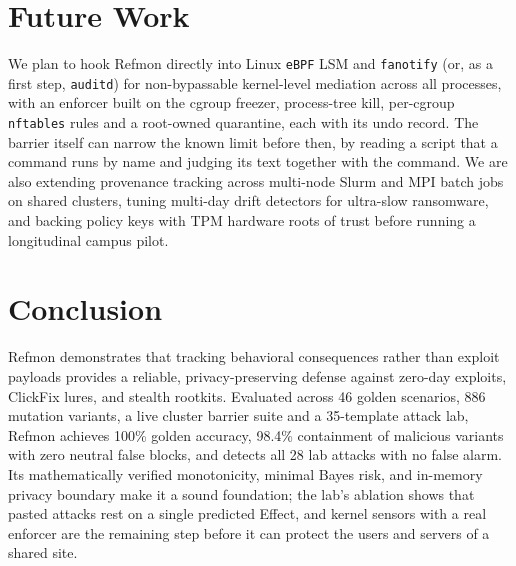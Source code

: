 \documentclass[10pt,twocolumn,letterpaper]{article}
\makeatletter
\theoremstyle{plain}
\theoremstyle{definition}
\theoremstyle{remark}
\DeclareRobustCommand{\_}{\ifmmode\nfss@text{\textunderscore}\else\textunderscore\penalty\@highpenalty\hskip\z@skip\fi}
\makeatother
\begin{document}
\section{Future Work}
\label{sec:future}
We plan to hook Refmon directly into Linux \texttt{eBPF} LSM and \texttt{fanotify} (or, as a first step, \texttt{auditd}) for non-bypassable kernel-level mediation across all processes, with an enforcer built on the cgroup freezer, process-tree kill, per-cgroup \texttt{nftables} rules and a root-owned quarantine, each with its undo record. The barrier itself can narrow the known limit before then, by reading a script that a command runs by name and judging its text together with the command. We are also extending provenance tracking across multi-node Slurm and MPI batch jobs on shared clusters, tuning multi-day drift detectors for ultra-slow ransomware, and backing policy keys with TPM hardware roots of trust before running a longitudinal campus pilot.

\section{Conclusion}
\label{sec:conclusion}
Refmon demonstrates that tracking behavioral consequences rather than exploit payloads provides a reliable, privacy-preserving defense against zero-day exploits, ClickFix lures, and stealth rootkits. Evaluated across 46 golden scenarios, 886 mutation variants, a live cluster barrier suite and a 35-template attack lab, Refmon achieves 100\% golden accuracy, 98.4\% containment of malicious variants with zero neutral false blocks, and detects all 28 lab attacks with no false alarm. Its mathematically verified monotonicity, minimal Bayes risk, and in-memory privacy boundary make it a sound foundation; the lab's ablation shows that pasted attacks rest on a single predicted Effect, and kernel sensors with a real enforcer are the remaining step before it can protect the users and servers of a shared site.

\end{document}
